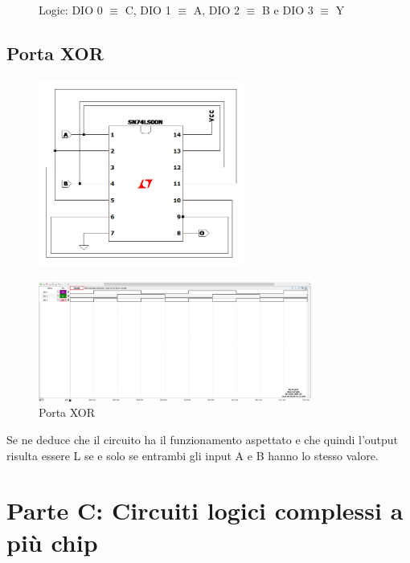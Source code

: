 \documentclass[10pt, a4paper, italian]{article}
\begin{document}
\begin{figure}[htbp]
    \centering
    \caption{Logic: DIO 0 $\equiv$ C, DIO 1 $\equiv$ A, DIO 2 $\equiv$ B e DIO 3 $\equiv$ Y}
\end{figure}

\subsection{Porta XOR}
\begin{figure}[htb!]
    \centering
    \includegraphics[width=0.6\textwidth]{NAND_XOR.png}
    \label{circuito3}
\end{figure}
\begin{figure}[htb!]
    \centering
    \includegraphics[width=0.8\textwidth]{xor_time.png}
    \caption{Porta XOR}
    \label{pat2}
\end{figure}
Se ne deduce che il circuito ha il funzionamento aspettato e che quindi l'output risulta essere L se e solo se entrambi gli input A e B hanno lo stesso valore.

\setcounter{section}{5}
\section*{Parte C: Circuiti logici complessi a più chip}
\end{document}

